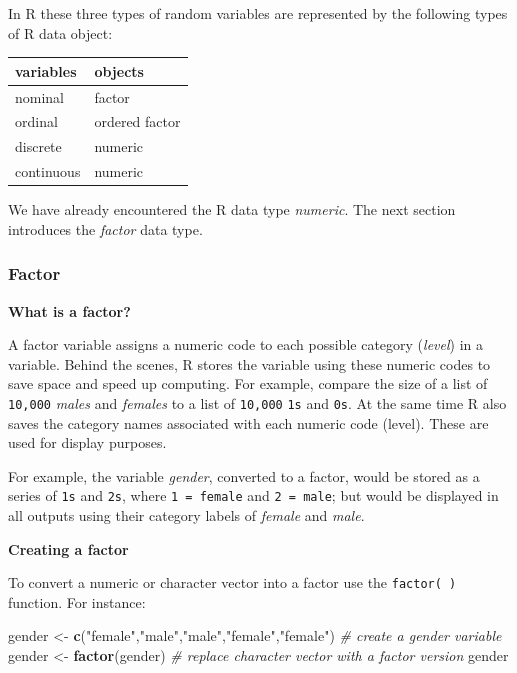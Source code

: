 \documentclass[
]{book}
\newenvironment{Shaded}{\begin{snugshade}}{\end{snugshade}}
\newcommand{\CommentTok}[1]{\textcolor[rgb]{0.56,0.35,0.01}{\textit{#1}}}
\newcommand{\KeywordTok}[1]{\textcolor[rgb]{0.13,0.29,0.53}{\textbf{#1}}}
\newcommand{\NormalTok}[1]{#1}
\newcommand{\StringTok}[1]{\textcolor[rgb]{0.31,0.60,0.02}{#1}}
\begin{document}
In R these three types of random variables are represented by the following types of R data object:

\begin{tabular}{l|l}
\hline
variables & objects\\
\hline
nominal & factor\\
\hline
ordinal & ordered factor\\
\hline
discrete & numeric\\
\hline
continuous & numeric\\
\hline
\end{tabular}

We have already encountered the R data type \emph{numeric}. The next section introduces the \emph{factor} data type.

\hypertarget{factor}{%
\subsubsection{Factor}\label{factor}}

\textbf{What is a factor?}

A factor variable assigns a numeric code to each possible category (\emph{level}) in a variable. Behind the scenes, R stores the variable using these numeric codes to save space and speed up computing. For example, compare the size of a list of \texttt{10,000} \emph{males} and \emph{females} to a list of \texttt{10,000} \texttt{1s} and \texttt{0s}. At the same time R also saves the category names associated with each numeric code (level). These are used for display purposes.

For example, the variable \emph{gender}, converted to a factor, would be stored as a series of \texttt{1s} and \texttt{2s}, where \texttt{1\ =\ female} and \texttt{2\ =\ male}; but would be displayed in all outputs using their category labels of \emph{female} and \emph{male}.

\textbf{Creating a factor}

To convert a numeric or character vector into a factor use the \texttt{factor(\ )} function. For instance:

\begin{Shaded}
\begin{Highlighting}[]
\NormalTok{gender <-}\StringTok{ }\KeywordTok{c}\NormalTok{(}\StringTok{"female"}\NormalTok{,}\StringTok{"male"}\NormalTok{,}\StringTok{"male"}\NormalTok{,}\StringTok{"female"}\NormalTok{,}\StringTok{"female"}\NormalTok{) }\CommentTok{# create a gender variable}
\NormalTok{gender <-}\StringTok{ }\KeywordTok{factor}\NormalTok{(gender) }\CommentTok{# replace character vector with a factor version}
\NormalTok{gender}
\end{Highlighting}
\end{Shaded}
\end{document}

